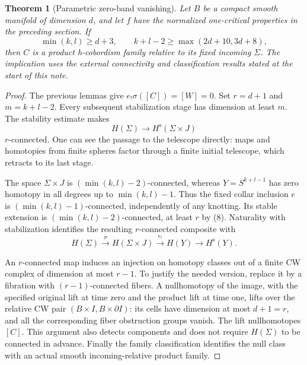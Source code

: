 \documentclass[11pt]{article}
\newtheorem{theorem}{Theorem}
\newcommand{\Hs}{H^{\mathrm s}}
\begin{document}
\begin{theorem}[Parametric zero-band vanishing]\label{thm:vanishing}
Let $B$ be a compact smooth manifold of dimension $d$, and let $f$ have
the normalized one-critical properties in the preceding section.
If
\[
 \min(k,l)\geq d+3,\qquad
 k+l-2\geq\max(2d+10,3d+8),                            \tag{8}
\]
then $C$ is a product h-cobordism family relative to its fixed incoming
$\Sigma$. The implication uses the external connectivity and
classification results stated at the start of this note.
\end{theorem}
\begin{proof}
The previous lemmas give $e_!\sigma([C])=[W]=0$.
Set $r=d+1$ and $m=k+l-2$. Every subsequent stabilization stage
has dimension at least $m$. The stability estimate makes
\[
 H(\Sigma)\longrightarrow\Hs(\Sigma\times J)
\]
$r$-connected. One can see the passage to the telescope directly:
maps and homotopies from finite spheres factor through a finite
initial telescope, which retracts to its last stage.

The space $\Sigma\times J$ is $(\min(k,l)-2)$-connected, whereas
$Y=S^{k+l-1}$ has zero homotopy in all degrees up to
$\min(k,l)-1$. Thus the fixed collar inclusion $e$ is
$(\min(k,l)-1)$-connected, independently of any knotting.
Its stable extension is $(\min(k,l)-2)$-connected, at least
$r$ by (8). Naturality with stabilization identifies the resulting
$r$-connected composite with
\[
 H(\Sigma)\xrightarrow{\sigma}H(\Sigma\times J)
 \xrightarrow{e_!}H(Y)\longrightarrow\Hs(Y).           \tag{9}
\]

An $r$-connected map induces an injection on homotopy classes out of
a finite CW complex of dimension at most $r-1$.
To justify the needed version, replace it by a fibration with
$(r-1)$-connected fibers. A nullhomotopy of the image, with the
specified original lift at time zero and the product lift at time
one, lifts over the relative CW pair
$(B\times I,B\times\partial I)$: its cells have dimension at most
$d+1=r$, and all the corresponding fiber obstruction groups vanish.
The lift nullhomotopes $[C]$. This argument also detects components
and does not require $H(\Sigma)$ to be connected in advance.
Finally the family classification identifies the null class with an
actual smooth incoming-relative product family.
\end{proof}
\end{document}
